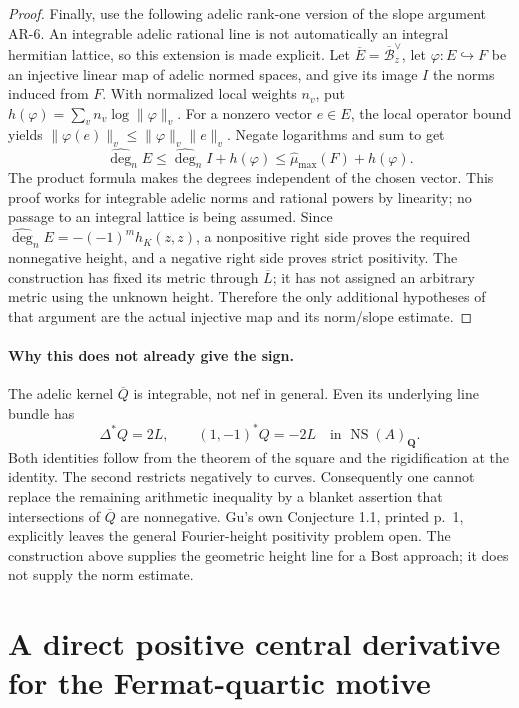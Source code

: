 \documentclass[11pt,a4paper]{article}
\begin{document}
\begin{proof}
Finally, use the following adelic rank-one version of the slope
argument AR-6. An integrable adelic rational line is not automatically
an integral hermitian lattice, so this extension is made explicit.
Let $\overline E=\overline{\mathcal B}_z^{\vee}$, let
$\varphi:E\hookrightarrow F$ be an injective linear map of adelic
normed spaces, and give its image $I$ the norms induced from $F$.
With normalized local weights $n_v$, put
$h(\varphi)=\sum_v n_v\log\|\varphi\|_v$.
For a nonzero vector $e\in E$, the local operator bound yields
$\|\varphi(e)\|_v\le\|\varphi\|_v\|e\|_v$.
Negate logarithms and sum to get
\[
 \widehat{\deg}_n E\le
 \widehat{\deg}_n I+h(\varphi)
 \le\widehat\mu_{\max}(F)+h(\varphi).
\]
The product formula makes the degrees independent of the chosen vector.
This proof works for integrable adelic norms and rational powers by
linearity; no passage to an integral lattice is being assumed.
Since $\widehat{\deg}_n E=-(-1)^m h_K(z,z)$, a nonpositive
right side proves the required nonnegative height, and a negative
right side proves strict positivity. The construction has fixed its metric through
$\overline L$; it has not assigned an arbitrary metric using the
unknown height. Therefore the only additional hypotheses of that
argument are the actual injective map and its norm/slope estimate.
\end{proof}

\paragraph{Why this does not already give the sign.}
The adelic kernel $\overline Q$ is integrable, not nef in general.
Even its underlying line bundle has
\[
 \Delta^*Q=2L,\qquad (1,-1)^*Q=-2L
 \quad\text{in }\operatorname{NS}(A)_{\mathbf Q}.
\]
Both identities follow from the theorem of the square and the
rigidification at the identity. The second restricts negatively to
curves. Consequently one cannot replace the remaining arithmetic
inequality by a blanket assertion that intersections of $\overline Q$
are nonnegative. Gu's own Conjecture 1.1, printed p.~1, explicitly leaves
the general Fourier-height positivity problem open. The construction
above supplies the geometric height line for a Bost approach; it does
not supply the norm estimate.
\section{A direct positive central derivative for the Fermat-quartic
motive}\label{a-direct-positive-central-derivative-for-the-fermat-quartic-motive}
\end{document}
